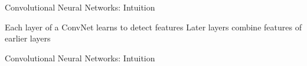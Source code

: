 %
%
%
%
%

\begin{slide}{Convolutional Neural Networks: Intuition}
  \begin{itemize}
    \pitem Each layer of a ConvNet learns to detect features
    \pitem Later layers combine features of earlier layers
  \end{itemize}
\end{slide}

\begin{slide}{Convolutional Neural Networks: Intuition}

\end{slide}

